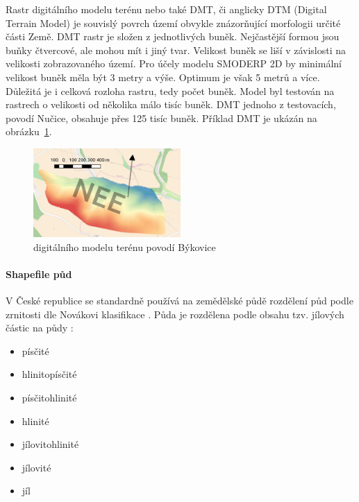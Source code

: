 Rastr digitálního modelu terénu nebo také DMT, či anglicky DTM (Digital Terrain Model) je souvislý povrch území obvykle znázorňující morfologii určité části Země. DMT rastr je složen z jednotlivých buněk. Nejčastější formou jsou buňky čtvercové, ale mohou mít i jiný tvar. Velikost buněk se liší v závislosti na velikosti zobrazovaného území. Pro účely modelu SMODERP 2D by minimální velikost buněk měla být 3 metry a výše. Optimum je však 5 metrů a více. Důležitá je i celková rozloha rastru, tedy počet buněk. Model byl testován na rastrech o velikosti od několika málo tisíc buněk. DMT jednoho z testovacích, povodí Nučice, obsahuje přes 125 tisíc buněk. Příklad DMT je ukázán na obrázku~\ref{fig:bykovicedmt}.

\begin{figure}
  \centering
  \includegraphics[width=0.5\textwidth]{./img/dmtbk.png}
  \caption{digitálního modelu terénu povodí Býkovice}
  \label{fig:bykovicedmt}
\end{figure}

\paragraph{Shapefile půd} \label{sec:vstuppuda}


V České republice se standardně používá na zemědělské půdě rozdělení půd podle zrnitosti dle Novákovi klasifikace . Půda je rozdělena podle obsahu tzv. jílových částic na půdy \cite{kavka}:
\begin{itemize} \itemsep 0pt
  \item písčité
  \item hlinitopísčité
  \item písčitohlinité
  \item hlinité
  \item jílovitohlinité
  \item jílovité
  \item jíl
\end{itemize}

